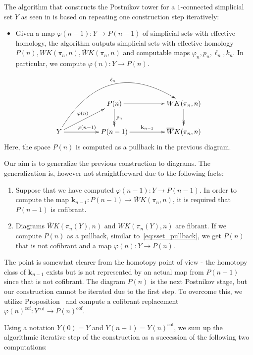 \documentclass[12pt,a4wide]{article}
\theoremstyle{plain}
\theoremstyle{definition}
\newcommand{\cofr}{\mathrm{cof}}
\newcommand{\heading}[1]{\vspace{1ex}\par\noindent{\bf\boldmath #1}}
\newcommand{\Pst}[1]{P(#1)}
\newcommand{\Pnewst}{\Pst{\then}}
\newcommand{\Poldst}{\Pst{\then-1}}
\newcommand{\Yst}[1]{Y(#1)}
\newcommand{\Ynewst}{\Yst{\then}}
\newcommand{\Ynnewst}{\Yst{\then+1}}
\newcommand{\towercompmap}[2]{#1(#2)}
\newcommand{\varphin}{\towercompmap{\varphi}{\then}}
\newcommand{\varphinmo}{\towercompmap{\varphi}{\then-1}}
\newcommand{\KnstY}{\overline WK(\pi_\then(Y),\then)}
\newcommand{\EnstY}{WK(\pi_\then(Y),\then)}
\newcommand{\Knst}{\overline WK(\pi_\then,\then)}
\newcommand{\Enst}{WK(\pi_\then,\then)}
\newcommand{\then}{n}
\newcommand{\thedim}{{n}}
\renewcommand\:{\colon}
\newcommand{\dY}{Y}
\newcommand\kkk{{\mathbf{k}}}
\begin{document}
The algorithm that constructs the Postnikov tower for a $1$-connected simplicial set $Y$ as seen in \cite{polypost, aslep} is based on repeating one construction step iteratively: 
\begin{itemize}
\item Given a map $\varphinmo \colon Y \to \Poldst$ of simplicial sets with effective homology, the algorithm outputs simplicial sets with effective homology $\Pnewst, \Enst, \Knst$ and computable maps $\varphi_{n},p_n, \ell_n, k_n$. In particular, we compute $\varphin \colon Y \to \Pnewst$.
\end{itemize}
\begin{equation}\label{eq:sset_pullback}
\xymatrix@C=50pt{
 &\Pnewst \ar@{->>}[d]^{p_n} \ar[r] & \Enst \ar@{->>}[d] \\
Y \ar[r]^{\varphinmo}  \ar[ur]^{\varphin}  \ar@/^50pt/[urr]^{\ell_n}& \Poldst \ar[r]^-{\kkk_{\thedim-1}} & \Knst
} 
\end{equation}
Here, the space $\Pnewst$ is computed as a pullback in the previous diagram.
\heading{Postnikov tower for diagrams}

Our aim is to generalize the previous construction to diagrams. The generalization is, however not straightforward due to the following facts:
\begin{enumerate}
\item Suppose that we have computed $\varphinmo\:Y \to\Poldst$. In order to compute the map $\kkk_{\thedim-1}\:\Poldst \to \Knst$, it is required that $\Poldst$ is cofibrant.
\item Diagrams $\KnstY$ and $\EnstY$ are fibrant. If we compute $\Pnewst$ as a pullback, similar to~\eqref{eq:sset_pullback}, we get $\Pnewst$ that is not cofibrant and a map $\varphin\: Y \to \Pnewst$.
\end{enumerate}

The point is somewhat clearer from the homotopy point of view - the homotopy class of $\kkk_{\thedim-1}$  exists but is not represented by an actual map from $\Poldst$ since that is not cofibrant. The diagram $\Pnewst$ is the next Postnikov stage, but our construction cannot be iterated due to the first step. To overcome this, we utilize Proposition~\label{p:cofibrep} and compute a cofibrant replacement  $\varphin^{\cofr}\: Y^\cofr \to \Pnewst ^\cofr$. 


Using a notation $\dY(0) = \dY$ and $\Ynnewst = \Ynewst ^\cofr$, we sum up the algorithmic iterative step of the construction as a succession of the following two computations:
\end{document}
